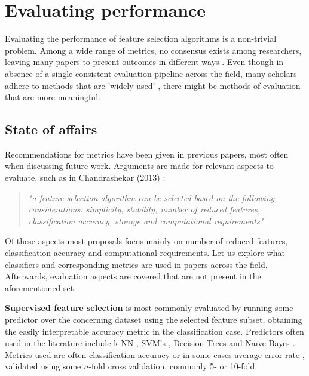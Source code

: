 \documentclass{article}
\begin{document}
\section{Evaluating performance}\label{sec:evaluation}
Evaluating the performance of feature selection algorithms is a non-trivial problem. Among a wide range of metrics, no consensus exists among researchers, leaving many papers to present outcomes in different ways \citep{guyon2003introduction}. Even though in absence of a single consistent evaluation pipeline across the field, many scholars adhere to methods that are 'widely used' \citep{solorio2020review} \citep{li2017feature}, there might be methods of evaluation that are more meaningful. %

\subsection{State of affairs}
Recommendations for metrics have been given in previous papers, most often when discussing future work. Arguments are made for relevant aspects to evaluate, such as in Chandrashekar (2013) \citep{chandrashekar2014survey}: \begin{quote}\textit{"a feature selection algorithm can be selected based on the following considerations: simplicity, stability, number of reduced features, classification accuracy, storage and computational requirements"}\end{quote}Of these aspects most proposals focus mainly on number of reduced features, classification accuracy and computational requirements. Let us explore what classifiers and corresponding metrics are used in papers across the field. Afterwards, evaluation aspects are covered that are not present in the aforementioned set.

\textbf{Supervised feature selection} is most commonly evaluated by running some predictor over the concerning dataset using the selected feature subset, obtaining the easily interpretable accuracy metric in the classification case. Predictors often used in the literature include k-NN \citep{al2020review} \citep{mafarja2020dragonfly}, SVM's \citep{chandrashekar2014survey}, Decision Trees \citep{li2017feature} and Naïve Bayes \citep{koller1996toward}. Metrics used are often classification accuracy or in some cases average error rate \citep{khurma2020evolopy}, validated using some $n$-fold cross validation, commonly 5- or 10-fold.
\end{document}

